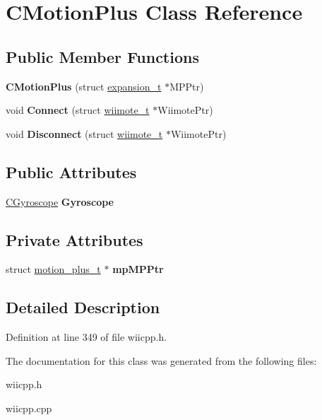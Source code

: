 \hypertarget{class_c_motion_plus}{\section{\-C\-Motion\-Plus \-Class \-Reference}
\label{class_c_motion_plus}
}
\subsection*{\-Public \-Member \-Functions}
\begin{DoxyCompactItemize}
\item 
\hypertarget{class_c_motion_plus_a6a7d7e2765c93610e2d62f343d254259}{{\bfseries \-C\-Motion\-Plus} (struct \hyperlink{structexpansion__t}{expansion\-\_\-t} $\ast$\-M\-P\-Ptr)}\label{class_c_motion_plus_a6a7d7e2765c93610e2d62f343d254259}

\item 
\hypertarget{class_c_motion_plus_a6f1816446589b1daa218eb04bd3aa9e2}{void {\bfseries \-Connect} (struct \hyperlink{structwiimote__t}{wiimote\-\_\-t} $\ast$\-Wiimote\-Ptr)}\label{class_c_motion_plus_a6f1816446589b1daa218eb04bd3aa9e2}

\item 
\hypertarget{class_c_motion_plus_a550b257a0dd6214094caf705a6cf5ee7}{void {\bfseries \-Disconnect} (struct \hyperlink{structwiimote__t}{wiimote\-\_\-t} $\ast$\-Wiimote\-Ptr)}\label{class_c_motion_plus_a550b257a0dd6214094caf705a6cf5ee7}

\end{DoxyCompactItemize}
\subsection*{\-Public \-Attributes}
\begin{DoxyCompactItemize}
\item 
\hypertarget{class_c_motion_plus_af0b450efc55f0f6808d1e67746f9542f}{\hyperlink{class_c_gyroscope}{\-C\-Gyroscope} {\bfseries \-Gyroscope}}\label{class_c_motion_plus_af0b450efc55f0f6808d1e67746f9542f}

\end{DoxyCompactItemize}
\subsection*{\-Private \-Attributes}
\begin{DoxyCompactItemize}
\item 
\hypertarget{class_c_motion_plus_ace56fafafa2b5105da94884e261c4a9c}{struct \hyperlink{structmotion__plus__t}{motion\-\_\-plus\-\_\-t} $\ast$ {\bfseries mp\-M\-P\-Ptr}}\label{class_c_motion_plus_ace56fafafa2b5105da94884e261c4a9c}

\end{DoxyCompactItemize}


\subsection{\-Detailed \-Description}


\-Definition at line 349 of file wiicpp.\-h.



\-The documentation for this class was generated from the following files\-:\begin{DoxyCompactItemize}
\item 
wiicpp.\-h\item 
wiicpp.\-cpp\end{DoxyCompactItemize}
